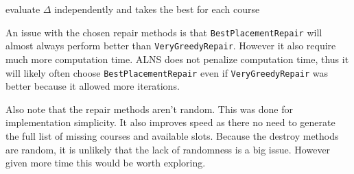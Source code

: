 \begin{algorithm}[H]
  \caption{evaluate $\Delta$ independently and takes the best for each course}
  \begin{algorithmic}[1]
        \State
           
            \State {}
          \EndIf
        \EndFor
      \EndFor
    \EndFunction
  \end{algorithmic}
\end{algorithm}

An issue with the chosen repair methods is that \texttt{BestPlacementRepair} will almost always perform better than \texttt{VeryGreedyRepair}. However it also require much more computation time. ALNS does not penalize computation time, thus it will likely often choose \texttt{BestPlacementRepair} even if \texttt{VeryGreedyRepair} was better because it allowed more iterations.

Also note that the repair methods aren't random. This was done for implementation simplicity. It also improves speed as there no need to generate the full list of missing courses and available slots. Because the destroy methods are random, it is unlikely that the lack of randomness is a big issue. However given more time this would be worth exploring.
